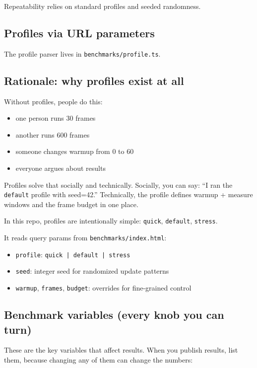 Repeatability relies on standard profiles and seeded randomness.

\subsection{Profiles via URL parameters}

The profile parser lives in \texttt{benchmarks/profile.ts}.

\subsection{Rationale: why profiles exist at all}

Without profiles, people do this:

\begin{itemize}
\item one person runs 30 frames
\item another runs 600 frames
\item someone changes warmup from 0 to 60
\item everyone argues about results
\end{itemize}

Profiles solve that socially and technically.
Socially, you can say: ``I ran the \texttt{default} profile with seed=42.''
Technically, the profile defines warmup + measure windows and the frame budget in one place.

In this repo, profiles are intentionally simple: \texttt{quick}, \texttt{default}, \texttt{stress}.

It reads query params from \texttt{benchmarks/index.html}:

\begin{itemize}
\item \texttt{profile}: \texttt{quick | default | stress}
\item \texttt{seed}: integer seed for randomized update patterns
\item \texttt{warmup}, \texttt{frames}, \texttt{budget}: overrides for fine-grained control
\end{itemize}

\subsection{Benchmark variables (every knob you can turn)}

These are the key variables that affect results.
When you publish results, list them, because changing any of them can change the numbers:

